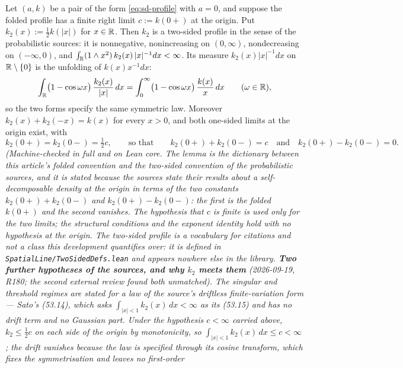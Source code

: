 \begin{lemma}\label{lem:folding-translation}
\leanok
Let $(a,k)$ be a pair of the form \ref{eq:sd-profile} with $a = 0$, and suppose the folded
profile has a finite right limit $c := k(0{+})$ at the origin. Put $k_2(x) := \tfrac12 k(|x|)$
for $x \in \mathbb{R}$. Then $k_2$ is a two-sided profile in the sense of the probabilistic sources:
it is nonnegative, nonincreasing on $(0,\infty)$, nondecreasing on $(-\infty,0)$, and
$\int_{\mathbb{R}} (1 \wedge x^2)\,k_2(x)\,|x|^{-1}dx < \infty$. Its \Levy{} measure
$k_2(x)|x|^{-1}dx$ on $\mathbb{R} \setminus \{0\}$ is the unfolding of $k(x)x^{-1}dx$:
\[
  \int_{\mathbb{R}} \bigl(1 - \cos\omega x\bigr)\,\frac{k_2(x)}{|x|}\,dx
   = \int_0^\infty \bigl(1 - \cos\omega x\bigr)\,\frac{k(x)}{x}\,dx
   \qquad (\omega \in \mathbb{R}),
\]
so the two forms specify the same symmetric law. Moreover $k_2(x) + k_2(-x) = k(x)$ for every
$x > 0$, and both one-sided limits at the origin exist, with
\[
  k_2(0{+}) = k_2(0{-}) = \tfrac12 c,
  \qquad\text{so that}\qquad
  k_2(0{+}) + k_2(0{-}) = c \quad\text{and}\quad k_2(0{+}) - k_2(0{-}) = 0 .
\]
\statusT\quad\emph{(Machine-checked in full and on Lean core. The lemma is the dictionary
between this article's folded convention and the two-sided convention of the probabilistic
sources, and it is stated because the sources state their results about a self-decomposable
density at the origin in terms of the two constants $k_2(0{+}) + k_2(0{-})$ and
$k_2(0{+}) - k_2(0{-})$: the first is the folded $k(0{+})$ and the second vanishes. The
hypothesis that $c$ is finite is used only for the two limits; the structural conditions and
the exponent identity hold with no hypothesis at the origin. The two-sided profile is a
vocabulary for citations and not a class this development quantifies over: it is defined in
\texttt{SpatialLine/TwoSidedDefs.lean} and appears nowhere else in the library.
\textbf{Two further hypotheses of the sources, and why $k_2$ meets them} (2026-09-19, R180; the
second external review found both unmatched). The singular and threshold regimes are stated for a
law of the source's driftless finite-variation form --- Sato's (53.14), which asks
$\int_{|x|<1}k_2(x)\,dx < \infty$ as its (53.15) and has no drift term and no Gaussian part. Under
the hypothesis $c < \infty$ carried above, $k_2 \le \tfrac12c$ on each side of the origin by
monotonicity, so $\int_{|x|<1}k_2(x)\,dx \le c < \infty$; the drift vanishes because the law is
specified through its cosine transform, which fixes the symmetrisation and leaves no first-order
}
\end{lemma}
